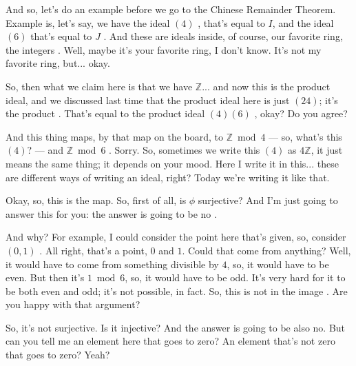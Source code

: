 \begin{speech}[00:02:30 - 00:04:48]
And so, let's do an example before we go to the Chinese Remainder Theorem. Example is, let's say, we have the ideal $(4)$ , that's equal to $I$, and the ideal $(6)$ that's equal to $J$ . And these are ideals inside, of course, our favorite ring, the integers . Well, maybe it's your favorite ring, I don't know. It's not my favorite ring, but... okay.

So, then what we claim here is that we have $\mathbb{Z}$... and now this is the product ideal, and we discussed last time that the product ideal here is just $(24)$; it's the product . That's equal to the product ideal $(4)(6)$ , okay? Do you agree?

And this thing maps, by that map on the board, to $\mathbb{Z} \bmod 4$ --- so, what's this $(4)$? --- and $\mathbb{Z} \bmod 6$ . Sorry. So, sometimes we write this $(4)$ as $4\mathbb{Z}$, it just means the same thing; it depends on your mood. Here I write it in this... these are different ways of writing an ideal, right? Today we're writing it like that.

Okay, so, this is the map. So, first of all, is $\phi$ surjective?  And I'm just going to answer this for you: the answer is going to be no .

And why? For example, I could consider the point here that's given, so, consider $(0, 1)$ . All right, that's a point, $0$ and $1$. Could that come from anything? Well, it would have to come from something divisible by $4$, so, it would have to be even. But then it's $1 \bmod 6$, so, it would have to be odd. It's very hard for it to be both even and odd; it's not possible, in fact. So, this is not in the image . Are you happy with that argument?

So, it's not surjective. Is it injective?  And the answer is going to be also no. But can you tell me an element here that goes to zero? An element that's not zero that goes to zero? Yeah?
\end{speech}

